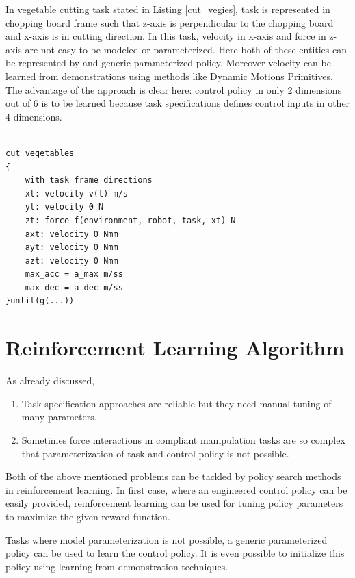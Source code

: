 \documentclass[thesis]{mas_proposal}
\begin{document}
In vegetable cutting task stated in Listing \ref{cut_vegies}, task is represented in chopping board frame such that z-axis is perpendicular to the chopping board and x-axis is in cutting direction. In this task, velocity in x-axis and force in z-axis are not easy to be modeled or parameterized. Here both of these entities can be represented by and generic parameterized policy. Moreover velocity can be learned from demonstrations using methods like Dynamic Motions Primitives\cite{lioutikov2016learning}. The advantage of the approach is clear here: control policy in only 2 dimensions out of 6 is to be learned because task specifications defines control inputs in other 4 dimensions. 

\begin{lstlisting}[label=cut_vegies,caption=Task specification for cutting vegetables]

cut_vegetables
{
	with task frame directions
	xt: velocity v(t) m/s
	yt: velocity 0 N
	zt: force f(environment, robot, task, xt) N
	axt: velocity 0 Nmm
	ayt: velocity 0 Nmm
	azt: velocity 0 Nmm
	max_acc = a_max m/ss
	max_dec = a_dec m/ss
}until(g(...))

\end{lstlisting}



\section{Reinforcement Learning Algorithm}

As already discussed, \begin{enumerate}
	\item Task specification approaches are reliable but they need manual tuning of many parameters.
	\item Sometimes force interactions in compliant manipulation tasks are so complex that parameterization of task and control policy is not possible. 
\end{enumerate}
Both of the above mentioned problems can be tackled by policy search methods in reinforcement learning. In first case, where an engineered control policy can be easily provided, reinforcement learning can be used for tuning policy parameters to maximize the given reward function.

Tasks where model parameterization is not possible, a generic parameterized policy can be used to learn the control policy. It is even possible to initialize this policy using learning from demonstration techniques.
\end{document}
